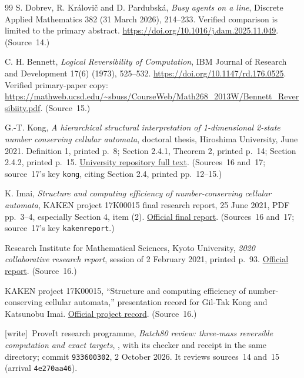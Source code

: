 \documentclass[11pt,letterpaper]{article}
\numberwithin{equation}{section}
\theoremstyle{definition}
\theoremstyle{remark}
\newcommand{\wtag}{\textup{[write]}}
\begin{document}
\begin{thebibliography}{99}
S. Dobrev, R. Kr\'{a}lovi\v{c} and D. Pardubsk\'{a}, \emph{Busy agents on a line}, Discrete Applied Mathematics 382 (31 March 2026), 214--233. Verified comparison is limited to the primary abstract. \url{https://doi.org/10.1016/j.dam.2025.11.049}.
(Source~14.)

C. H. Bennett, \emph{Logical Reversibility of Computation}, IBM Journal of Research and Development 17(6) (1973), 525--532. \url{https://doi.org/10.1147/rd.176.0525}. Verified primary-paper copy: \url{https://mathweb.ucsd.edu/~sbuss/CourseWeb/Math268_2013W/Bennett_Reversibiity.pdf}.
(Source~15.)

G.-T. Kong, \emph{A hierarchical structural interpretation of 1-dimensional 2-state number conserving cellular automata}, doctoral thesis, Hiroshima University, June 2021. Definition 1, printed p.~8; Section 2.4.1, Theorem 2, printed p.~14; Section 2.4.2, printed p.~15. \href{https://hiroshima.repo.nii.ac.jp/record/2002360/files/k8621_3.pdf}{University repository full text}.
(Sources~16 and~17; source~17's key \texttt{kong}, citing Section 2.4, printed pp.~12--15.)

K. Imai, \emph{Structure and computing efficiency of number-conserving cellular automata}, KAKEN project 17K00015 final research report, 25 June 2021, PDF pp.~3--4, especially Section 4, item (2). \href{https://kaken.nii.ac.jp/file/KAKENHI-PROJECT-17K00015/17K00015seika.pdf}{Official final report}.
(Sources~16 and~17; source~17's key \texttt{kakenreport}.)

Research Institute for Mathematical Sciences, Kyoto University, \emph{2020 collaborative research report}, session of 2 February 2021, printed p.~93. \href{https://www.kurims.kyoto-u.ac.jp/kyoten/ja/files/kyodo_report_2020.pdf}{Official report}.
(Source~16.)

KAKEN project 17K00015, ``Structure and computing efficiency of number-conserving cellular automata,'' presentation record for Gil-Tak Kong and Katsunobu Imai. \href{https://kaken.nii.ac.jp/grant/KAKENHI-PROJECT-17K00015/}{Official project record}.
(Source~16.)

\wtag\ ProveIt research programme, \emph{Batch80 review: three-mass reversible computation and exact targets}, , with its checker and receipt in the same directory; commit \texttt{933600302}, 2 October 2026. It reviews sources~14 and~15 (arrival \texttt{4e270aa46}).


\end{thebibliography}
\end{document}
